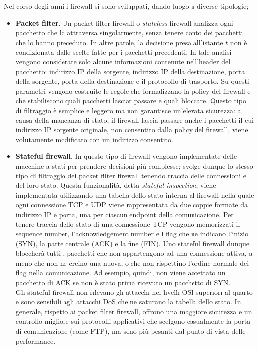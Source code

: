 Nel corso degli anni i firewall si sono sviluppati, dando luogo a diverse tipologie;
\begin{itemize}
	\item \textbf{Packet filter}. Un packet filter firewall o \textit{stateless} firewall analizza ogni pacchetto che lo attraversa singolarmente, senza tenere conto dei pacchetti che lo hanno preceduto. In altre parole, la decisione presa all'istante $t$ non è condizionata dalle scelte fatte per i pacchetti precedenti. In tale analisi vengono considerate solo alcune informazioni contenute nell'header del pacchetto: indirizzo IP della sorgente, indirizzo IP della destinazione, porta della sorgente, porta della destinazione e il protocollo di trasporto. Su questi parametri vengono costruite le regole che formalizzano la policy del firewall e che stabiliscono quali pacchetti lasciar passare e quali bloccare. Questo tipo di filtraggio è semplice e leggero ma non garantisce un'elevata sicurezza: a causa della mancanza di stato, il firewall lascia passare anche i pacchetti il cui indirizzo IP sorgente originale, non consentito dalla policy del firewall, viene volutamente modificato con un indirizzo consentito.
	\item \textbf{Stateful firewall}. In questo tipo di firewall vengono implementate delle macchine a stati per prendere decisioni più complesse; svolge dunque lo stesso tipo di filtraggio dei packet filter firewall tenendo traccia delle connessioni e del loro stato.  Questa funzionalità, detta \textit{stateful inspection}, viene implementata utilizzando una tabella dello stato interna al firewall nella quale ogni connessione TCP e UDP viene rappresentata da due coppie formate da indirizzo IP e porta, una per ciascun endpoint della comunicazione. Per tenere traccia dello stato di una connessione TCP vengono memorizzati il sequence number, l'acknowledgement number e i flag che ne indicano l'inizio (SYN), la parte centrale (ACK) e la fine (FIN).  Uno stateful firewall dunque bloccherà tutti i pacchetti che non appartengono ad una connessione attiva, a meno che non ne creino una nuova, o che non rispettino l'ordine normale dei flag nella comunicazione. Ad esempio, quindi, non viene accettato un pacchetto di ACK se non è stato prima ricevuto un pacchetto di SYN.\\
	Gli stateful firewall non rilevano gli attacchi nei livelli OSI superiori al quarto e sono sensibili agli attacchi DoS che ne saturano la tabella dello stato. In generale, rispetto ai packet filter firewall, offrono una maggiore sicurezza e un controllo migliore sui protocolli applicativi che scelgono casualmente la porta di comunicazione (come FTP), ma sono più pesanti dal punto di vista delle performance.

\end{itemize}
